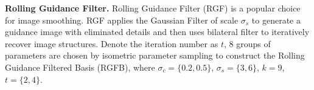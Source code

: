 \documentclass[twocolumn]{svjour3}          %
\begin{document}
\begin{figure*}[!th]
\end{figure*}


\textbf{Rolling Guidance Filter.}
Rolling Guidance Filter (RGF) \cite{RGF} is a popular choice for image smoothing. RGF applies the Gaussian Filter of scale $\sigma_{s}$ to generate a guidance image with eliminated details and then uses bilateral filter to iteratively recover image structures. Denote the iteration number as $t$, 8 groups of parameters are chosen by isometric parameter sampling to construct the Rolling Guidance Filtered Basis (RGFB), where $\sigma_{c}=\{0.2,0.5\}$, $\sigma_{s}=\{3,6\}$, $k = 9$, $t = \{2,4\}$.
\end{document}

